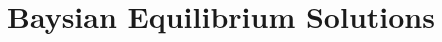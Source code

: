 \appendix
\addappheadtotoc
{}
\renewcommand{\theequation}{\arabic{equation}}
\section{Baysian Equilibrium Solutions}














